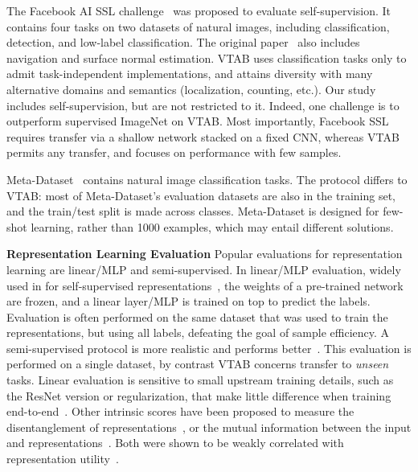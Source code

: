\documentclass{article}
\newcommand{\myparagraph}[1]{\noindent\textbf{#1}\quad}
\newcommand{\imagenet}{ImageNet}
\begin{document}
The Facebook AI SSL challenge~\citep{fai2019} was proposed to evaluate self-supervision.
It contains four tasks on two datasets of natural images, including classification, detection, and low-label classification.
The original paper~\citep{goyal2019scaling} also includes navigation and surface normal estimation.
VTAB uses classification tasks only to admit task-independent implementations,
and attains diversity with many alternative domains and semantics (localization, counting, etc.).
Our study includes self-supervision, but are not restricted to it.
Indeed, one challenge is to outperform supervised \imagenet{} on VTAB.
Most importantly, Facebook SSL requires transfer via a shallow network stacked on a 
fixed CNN, whereas VTAB permits any transfer, and focuses on performance with few samples.

Meta-Dataset~\citep{triantafillou2019meta} contains natural image
classification tasks. 
The protocol differs to VTAB: most of Meta-Dataset's evaluation datasets are also in the training set, and the train/test split is made across classes.
Meta-Dataset is designed for few-shot learning, rather than 1000 examples, which may entail different solutions.



\myparagraph{Representation Learning Evaluation}
Popular evaluations for representation learning are linear/MLP and semi-supervised. 
In linear/MLP evaluation, widely used in for self-supervised representations~\citep{doersch2015unsupervised,zhang2016colorful,noroozi2016unsupervised,doersch2017multi}, the weights of a pre-trained network are frozen, and a linear layer/MLP is trained on top to predict the labels. 
Evaluation is often performed on the same dataset that was used to train the representations, but using all labels, defeating the goal of sample efficiency.
A semi-supervised protocol is more realistic and performs better~\citep{zhai2019s4l}. 
This evaluation is performed on a single dataset, by contrast VTAB concerns transfer to \emph{unseen} tasks.
Linear evaluation is sensitive to small upstream training details, such as the ResNet version or regularization, that make little difference when training end-to-end~\citep{kornblith2018better,kolesnikov2019revisiting}.
Other intrinsic scores have been proposed to measure the disentanglement of representations~\citep{locatello2018challenging}, or the mutual information between the input and representations~\citep{hjelm2018learning}.
Both were shown to be weakly correlated with representation utility~\citep{locatello2018challenging,tschannen2019mutual}.
\end{document}
